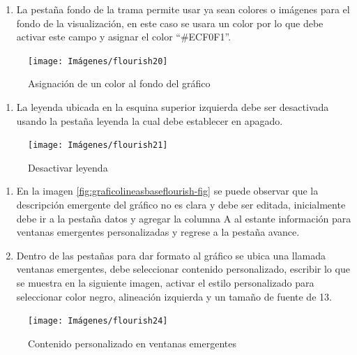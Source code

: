\documentclass[
]{book}
\providecommand{\tightlist}{%
  \setlength{\itemsep}{0pt}\setlength{\parskip}{0pt}}
\begin{document}
\begin{enumerate}
\def\labelenumi{\arabic{enumi}.}
\setcounter{enumi}{9}
\tightlist
\item
  La pestaña fondo de la trama permite usar ya sean colores o imágenes para el fondo de la visualización, en este caso se usara un color por lo que debe activar este campo y asignar el color ``\#ECF0F1''.
\end{enumerate}

\begin{figure}

{\centering \texttt{[image: Imágenes/flourish20]} 

}

\caption{Asignación de un color al fondo del gráfico}\label{fig:fondodetramaflourish-fig}
\end{figure}

\begin{enumerate}
\def\labelenumi{\arabic{enumi}.}
\setcounter{enumi}{10}
\tightlist
\item
  La leyenda ubicada en la esquina superior izquierda debe ser desactivada usando la pestaña leyenda la cual debe establecer en apagado.
\end{enumerate}

\begin{figure}

{\centering \texttt{[image: Imágenes/flourish21]} 

}

\caption{Desactivar leyenda}\label{fig:desactivarleyendaflourish-fig}
\end{figure}

\begin{enumerate}
\def\labelenumi{\arabic{enumi}.}
\setcounter{enumi}{11}
\item
  En la imagen \ref{fig:graficolineasbaseflourish-fig} se puede observar que la descripción emergente del gráfico no es clara y debe ser editada, inicialmente debe ir a la pestaña datos y agregar la columna A al estante información para ventanas emergentes personalizadas y regrese a la pestaña avance.
\item
  Dentro de las pestañas para dar formato al gráfico se ubica una llamada ventanas emergentes, debe seleccionar contenido personalizado, escribir lo que se muestra en la siguiente imagen, activar el estilo personalizado para seleccionar color negro, alineación izquierda y un tamaño de fuente de 13.
\end{enumerate}

\begin{figure}

{\centering \texttt{[image: Imágenes/flourish24]} 

}

\caption{Contenido personalizado en ventanas emergentes}\label{fig:contenidopersonalizadoventasemergentesflourish-fig}
\end{figure}
\end{document}
